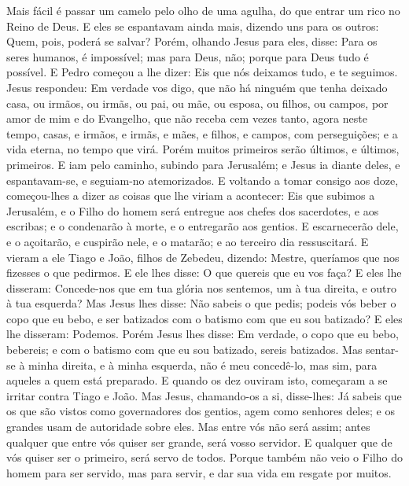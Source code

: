 {  Mais fácil é passar um camelo pelo olho de uma agulha, do que entrar um rico no Reino de Deus.
  E eles se espantavam ainda mais, dizendo uns para os outros: Quem, pois, poderá se salvar?
  Porém, olhando Jesus para eles, disse: Para os seres humanos, é impossível; mas para Deus, não; porque para Deus tudo é possível.
  E Pedro começou a lhe dizer: Eis que nós deixamos tudo, e te seguimos.
  Jesus respondeu: Em verdade vos digo, que não há ninguém que tenha deixado casa, ou irmãos, ou irmãs, ou pai, ou mãe, ou esposa, ou filhos, ou campos, por amor de mim e do Evangelho,
  que não receba cem vezes tanto, agora neste tempo, casas, e irmãos, e irmãs, e mães, e filhos, e campos, com perseguições; e a vida eterna, no tempo que virá.
  Porém muitos primeiros serão últimos, e últimos, primeiros.
  E iam pelo caminho, subindo para Jerusalém; e Jesus ia diante deles, e espantavam-se, e seguiam-no atemorizados. E voltando a tomar consigo aos doze, começou-lhes a dizer as coisas que lhe viriam a acontecer:
  Eis que subimos a Jerusalém, e o Filho do homem será entregue aos chefes dos sacerdotes, e aos escribas; e o condenarão à morte, e o entregarão aos gentios.
  E escarnecerão dele, e o açoitarão, e cuspirão nele, e o matarão; e ao terceiro dia ressuscitará.
  E vieram a ele Tiago e João, filhos de Zebedeu, dizendo: Mestre, queríamos que nos fizesses o que pedirmos.
  E ele lhes disse: O que quereis que eu vos faça?
  E eles lhe disseram: Concede-nos que em tua glória nos sentemos, um à tua direita, e outro à tua esquerda?
  Mas Jesus lhes disse: Não sabeis o que pedis; podeis vós beber o copo que eu bebo, e ser batizados com o batismo com que eu sou batizado?
  E eles lhe disseram: Podemos. Porém Jesus lhes disse: Em verdade, o copo que eu bebo, bebereis; e com o batismo com que eu sou batizado, sereis batizados.
  Mas sentar-se à minha direita, e à minha esquerda, não é meu concedê-lo, mas sim, para aqueles a quem está preparado.
  E quando os dez ouviram isto, começaram a se irritar contra Tiago e João.
  Mas Jesus, chamando-os a si, disse-lhes: Já sabeis que os que são vistos como governadores dos gentios, agem como senhores deles; e os grandes usam de autoridade sobre eles.
  Mas entre vós não será assim; antes qualquer que entre vós quiser ser grande, será vosso servidor.
  E qualquer que de vós quiser ser o primeiro, será servo de todos.
  Porque também não veio o Filho do homem para ser servido, mas para servir, e dar sua vida em resgate por muitos.
}
